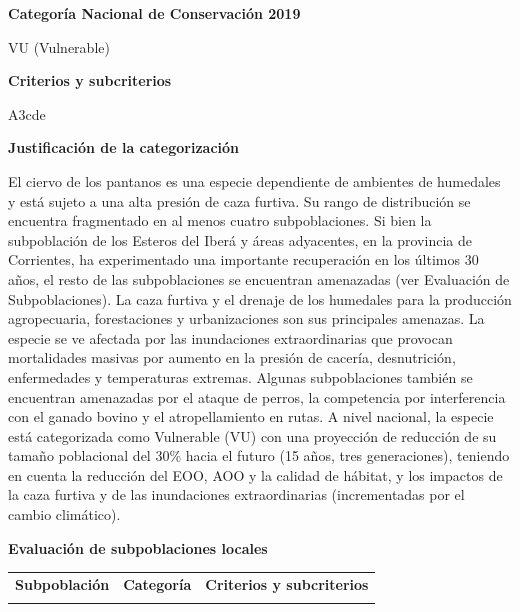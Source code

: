 \documentclass[
  x11names]{article}
\begin{document}
%
\begin{table}[H]
\centering
\begin{tabular}[t]{>{\raggedright\arraybackslash}m{16cm}>{}m{16cm}}
\toprule
\cellcolor{ceil}{\textcolor{white}{\textbf{\rule{0pt}{14pt}CATEGORÍAS DE CONSERVACIÓN}}}\\
\bottomrule
\end{tabular}
\end{table}

\vspace{-0.4cm}

\textbf{Categoría Nacional de Conservación 2019}

VU (Vulnerable)

\textbf{Criterios y subcriterios}

A3cde

\textbf{Justificación de la categorización}

El ciervo de los pantanos es una especie dependiente de ambientes de
humedales y está sujeto a una alta presión de caza furtiva. Su rango de
distribución se encuentra fragmentado en al menos cuatro subpoblaciones.
Si bien la subpoblación de los Esteros del Iberá y áreas adyacentes, en
la provincia de Corrientes, ha experimentado una importante recuperación
en los últimos 30 años, el resto de las subpoblaciones se encuentran
amenazadas (ver Evaluación de Subpoblaciones). La caza furtiva y el
drenaje de los humedales para la producción agropecuaria, forestaciones
y urbanizaciones son sus principales amenazas. La especie se ve afectada
por las inundaciones extraordinarias que provocan mortalidades masivas
por aumento en la presión de cacería, desnutrición, enfermedades y
temperaturas extremas. Algunas subpoblaciones también se encuentran
amenazadas por el ataque de perros, la competencia por interferencia con
el ganado bovino y el atropellamiento en rutas. A nivel nacional, la
especie está categorizada como Vulnerable (VU) con una proyección de
reducción de su tamaño poblacional del 30\% hacia el futuro (15 años,
tres generaciones), teniendo en cuenta la reducción del EOO, AOO y la
calidad de hábitat, y los impactos de la caza furtiva y de las
inundaciones extraordinarias (incrementadas por el cambio climático).

\textbf{Evaluación de subpoblaciones locales}

\begin{tabu} to 
\toprule
\textbf{Subpoblación} & \textbf{Categoría} & \textbf{Criterios y subcriterios}\\
\midrule
{} &  & \\
\bottomrule
\end{tabu}
\end{document}
